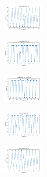 \begin{figure}[H]
    \hfill
    \begin{subfigure}
        \centering
        \includegraphics[width=0.234\textwidth]{img/ils-es/ecoli_set_const_10_589741062_time.png}
    \end{subfigure}
    \hfill
    \begin{subfigure}
        \centering
        \includegraphics[width=0.234\textwidth]{img/ils-es/rand_set_const_10_589741062_time.png}
    \end{subfigure}
    \hfill
    \begin{subfigure}
        \centering
        \includegraphics[width=0.234\textwidth]{img/ils-es/newthyroid_set_const_10_589741062_time.png}
    \end{subfigure}
    \hfill
    \begin{subfigure}
        \centering
        \includegraphics[width=0.234\textwidth]{img/ils-es/iris_set_const_10_277451237_time.png}
    \end{subfigure}
    \hfill
    \begin{subfigure}
        \centering
        \includegraphics[width=0.234\textwidth]{img/ils-es/ecoli_set_const_10_277451237_time.png}
    \end{subfigure}
    \hfill
    \begin{subfigure}

\end{subfigure}
\end{figure}
